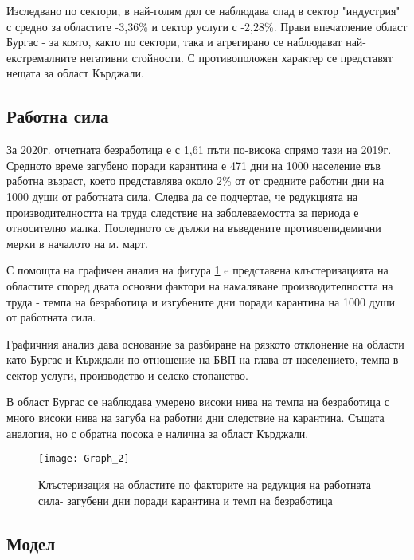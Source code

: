 \documentclass[a4paper,12pt]{article}
\begin{document}
Изследвано по сектори, в най-голям дял се наблюдава спад в сектор "индустрия" с средно за областите -3,36\% и сектор услуги с -2,28\%. Прави впечатление област Бургас - за която, както по сектори, така и агрегирано се наблюдават най-екстремалните негативни стойности. С противоположен характер се представят нещата за област Кърджали. 

\subsection{Работна сила}
За 2020г. отчетната безработица е с 1,61 пъти по-висока спрямо тази на 2019г. Средното време загубено поради карантина е 471 дни на 1000 население във работна възраст, което представлява около 2\% от от средните работни дни на 1000 души от работната сила. Следва да се подчертае, че редукцията на производителността на труда следствие на заболеваемостта за периода е относително малка. Последното се дължи на въведените противоепидемични мерки в началото на м. март. 

С помощта на графичен анализ на фигура \ref{fig:graph2} e представена клъстеризацията на областите според двата основни фактори на намаляване производителността на труда - темпа на безработица и изгубените дни поради карантина на 1000 души от работната сила.

Графичния анализ дава основание за разбиране на рязкото отклонение на области като Бургас и Кърждали по отношение на БВП на глава от населението, темпа в сектор услуги, производство и селско стопанство.

В област Бургас се наблюдава умерено високи нива на темпа на безработица с много високи нива на загуба на работни дни следствие на карантина. Същата аналогия, но с обратна посока е налична за област Кърджали. 

\newpage
\begin{figure}[H]

	\centering
	\hspace*{-2cm}
	\vspace*{-2 cm}
	\texttt{[image: Graph\_2]}
	\caption{{\scriptsize Клъстеризация на областите по факторите на редукция на работната сила- загубени дни поради карантина и темп на безработица}}
	\label{fig:graph2}
\end{figure}
\newpage

\subsection{Модел} 
\end{document}
